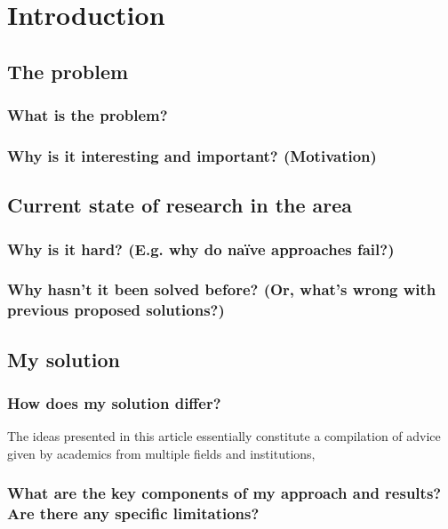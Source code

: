 \chapter{Introduction}

\section{The problem}

\subsection{What is the problem?}
\cite{Widom2006TipsPapers}

\subsection{Why is it interesting and important? (Motivation)}



\section{Current state of research in the area}

\subsection{Why is it hard? (E.g. why do naïve approaches fail?)}

\subsection{Why hasn’t it been solved before? (Or, what’s wrong with previous proposed solutions?)}

\section{My solution}

\subsection{How does my solution differ?}
The ideas presented in this article essentially constitute a compilation of advice given by academics from multiple fields and institutions,

\subsection{What are the key components of my approach and results? Are there any specific limitations?}

